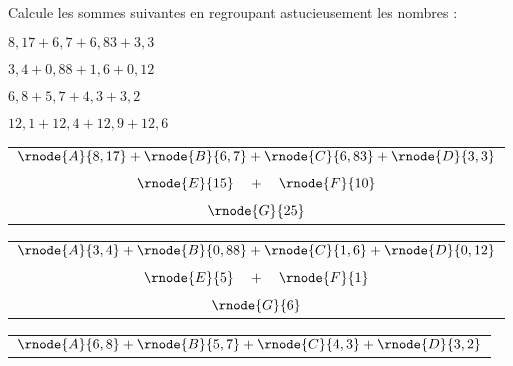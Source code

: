 Calcule les sommes suivantes en regroupant astucieusement les nombres :
\begin{myenumerate}
\item $8,17+6,7+6,83+3,3$
\item $3,4+0,88+1,6+0,12$
\item $6,8+5,7+4,3+3,2$
\item $12,1+12,4+12,9+12,6$
\end{myenumerate}
\begin{multicols}{2}
\begin{myenumerate}
  \item\subitem{}\par
    \begin{center}
      \begin{tabular}{c}
$\rnode{A}{8,17}+\rnode{B}{6,7}+\rnode{C}{6,83}+\rnode{D}{3,3}$\\
\\
$\rnode{E}{15}\quad+\quad\rnode{F}{10}$\\
\\
$\rnode{G}{25}$\\
      \end{tabular}
    \end{center}
  \item\subitem{}\par
    \begin{center}
      \begin{tabular}{c}
$\rnode{A}{3,4}+\rnode{B}{0,88}+\rnode{C}{1,6}+\rnode{D}{0,12}$\\
\\
$\rnode{E}{5}\quad+\quad\rnode{F}{1}$\\
\\
$\rnode{G}{6}$\\
      \end{tabular}
    \end{center}
  \item\subitem{}\par
    \begin{center}
      \begin{tabular}{c}
$\rnode{A}{6,8}+\rnode{B}{5,7}+\rnode{C}{4,3}+\rnode{D}{3,2}$\\

\end{tabular}
\end{center}
\end{myenumerate}
\end{multicols}

